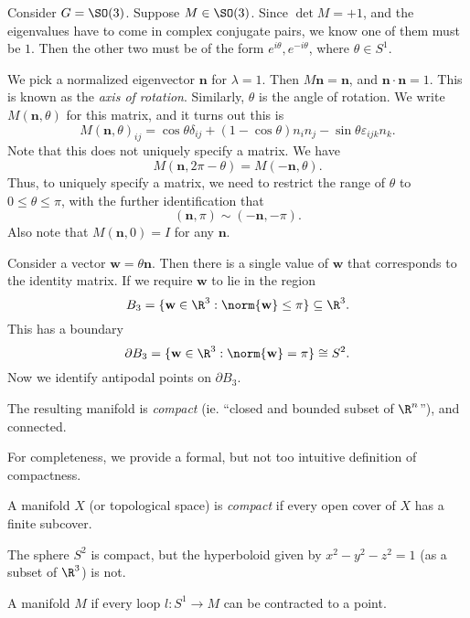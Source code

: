 \documentclass[a4paper]{article}
\begin{document}
\begin{eg}
  Consider $G = \SO(3)$. Suppose $M \in \SO(3)$. Since $\det M = +1$, and the eigenvalues have to come in complex conjugate pairs, we know one of them must be $1$. Then the other two must be of the form $e^{i\theta}, e^{-i\theta}$, where $\theta \in S^1$.

  We pick a normalized eigenvector $\mathbf{n}$ for $\lambda = 1$. Then $M\mathbf{n} = \mathbf{n}$, and $\mathbf{n} \cdot \mathbf{n} = 1$. This is known as the \emph{axis of rotation}. Similarly, $\theta$ is the angle of rotation. We write $M(\mathbf{n}, \theta)$ for this matrix, and it turns out this is
  \[
    M(\mathbf{n}, \theta)_{ij} = \cos \theta \delta_{ij} + (1 - \cos \theta)n_i n_j - \sin \theta \varepsilon_{ijk} n_k.
  \]
  Note that this does not uniquely specify a matrix. We have
  \[
    M(\mathbf{n}, 2\pi - \theta) = M(-\mathbf{n}, \theta).
  \]
  Thus, to uniquely specify a matrix, we need to restrict the range of $\theta$ to $0 \leq \theta \leq \pi$, with the further identification that
  \[
    (\mathbf{n}, \pi) \sim (-\mathbf{n}, -\pi).
  \]
  Also note that $M(\mathbf{n}, 0) = I$ for any $\mathbf{n}$.

  Consider a vector $\mathbf{w} = \theta \mathbf{n}$. Then there is a single value of $\mathbf{w}$ that corresponds to the identity matrix. If we require $\mathbf{w}$ to lie in the region
  \[
    B_3 = \{\mathbf{w} \in \R^3: \norm{\mathbf{w}} \leq \pi\} \subseteq \R^3.
  \]
  This has a boundary
  \[
    \partial B_3 = \{\mathbf{w} \in \R^3: \norm{\mathbf{w}} = \pi\} \cong S^2.
  \]
  Now we identify antipodal points on $\partial B_3$.

  The resulting manifold is \emph{compact} (ie. ``closed and bounded subset of $\R^n$''), and connected.
\end{eg}
For completeness, we provide a formal, but not too intuitive definition of compactness.
\begin{defi}[Compact]
  A manifold $X$ (or topological space) is \emph{compact} if every open cover of $X$ has a finite subcover.
\end{defi}

\begin{eg}
  The sphere $S^2$ is compact, but the hyperboloid given by $x^2 - y^2 - z^2 = 1$ (as a subset of $\R^3$) is not.
\end{eg}

\begin{defi}
  A manifold $M$ if every loop $l: S^1 \to M$ can be contracted to a point.
\end{defi}
\end{document}
